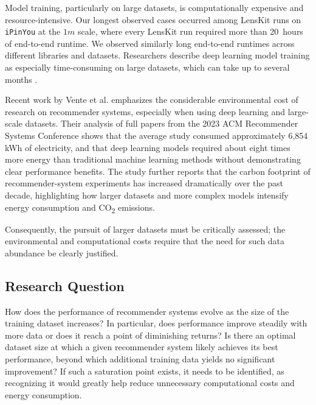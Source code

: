 \documentclass[sigconf,nonacm]{acmart}
\begin{document}
Model training, particularly on large datasets, is computationally expensive and resource-intensive. Our longest observed cases occurred among LensKit runs on \texttt{iPinYou} at the $1m$ scale, where every LensKit run required more than 20~hours of end-to-end runtime. We observed similarly long end-to-end runtimes across different libraries and datasets. Researchers describe deep learning model training as especially time-consuming on large datasets, which can take up to several months \cite{dong2020}.

Recent work by Vente et al. \cite{vente2024} emphasizes the considerable environmental cost of research on recommender systems, especially when using deep learning and large-scale datasets. Their analysis of full papers from the 2023 ACM Recommender Systems Conference shows that the average study consumed approximately 6,854 kWh of electricity, and that deep learning models required about eight times more energy than traditional machine learning methods without demonstrating clear performance benefits. The study further reports that the carbon footprint of recommender-system experiments has increased dramatically over the past decade, highlighting how larger datasets and more complex models intensify energy consumption and CO\textsubscript{2} emissions.

Consequently, the pursuit of larger datasets must be critically assessed; the environmental and computational costs require that the need for such data abundance be clearly justified.

\subsection{Research Question}
How does the performance of recommender systems evolve as the size of the training dataset increases? In particular, does performance improve steadily with more data or does it reach a point of diminishing returns? Is there an optimal dataset size at which a given recommender system likely achieves its best performance, beyond which additional training data yields no significant improvement? If such a saturation point exists, it needs to be identified, as recognizing it would greatly help reduce unnecessary computational costs and energy consumption.
\end{document}
